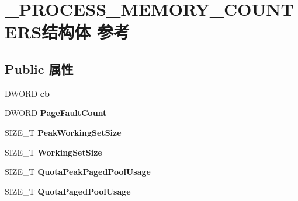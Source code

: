 \hypertarget{struct___p_r_o_c_e_s_s___m_e_m_o_r_y___c_o_u_n_t_e_r_s}{}\section{\+\_\+\+P\+R\+O\+C\+E\+S\+S\+\_\+\+M\+E\+M\+O\+R\+Y\+\_\+\+C\+O\+U\+N\+T\+E\+R\+S结构体 参考}
\label{struct___p_r_o_c_e_s_s___m_e_m_o_r_y___c_o_u_n_t_e_r_s}
\subsection*{Public 属性}
\begin{DoxyCompactItemize}
\item 
\mbox{\label{struct___p_r_o_c_e_s_s___m_e_m_o_r_y___c_o_u_n_t_e_r_s_a85808af677accd49a314acf4e696b39c}} 
D\+W\+O\+RD {\bfseries cb}
\item 
\mbox{\label{struct___p_r_o_c_e_s_s___m_e_m_o_r_y___c_o_u_n_t_e_r_s_a20f65f8cbb0a08fcee3a25e071a918c5}} 
D\+W\+O\+RD {\bfseries Page\+Fault\+Count}
\item 
\mbox{\label{struct___p_r_o_c_e_s_s___m_e_m_o_r_y___c_o_u_n_t_e_r_s_a62465a4b36c8215b630790fe776380b4}} 
S\+I\+Z\+E\+\_\+T {\bfseries Peak\+Working\+Set\+Size}
\item 
\mbox{\label{struct___p_r_o_c_e_s_s___m_e_m_o_r_y___c_o_u_n_t_e_r_s_a5e5635d2c6866a11f2edbcbcbd2c0ced}} 
S\+I\+Z\+E\+\_\+T {\bfseries Working\+Set\+Size}
\item 
\mbox{\label{struct___p_r_o_c_e_s_s___m_e_m_o_r_y___c_o_u_n_t_e_r_s_aeadc712b27d124bb3160922c974b07ac}} 
S\+I\+Z\+E\+\_\+T {\bfseries Quota\+Peak\+Paged\+Pool\+Usage}
\item 
\mbox{\label{struct___p_r_o_c_e_s_s___m_e_m_o_r_y___c_o_u_n_t_e_r_s_afdf028033abf73784b343b96824e74ef}} 
S\+I\+Z\+E\+\_\+T {\bfseries Quota\+Paged\+Pool\+Usage}

\end{DoxyCompactItemize}
